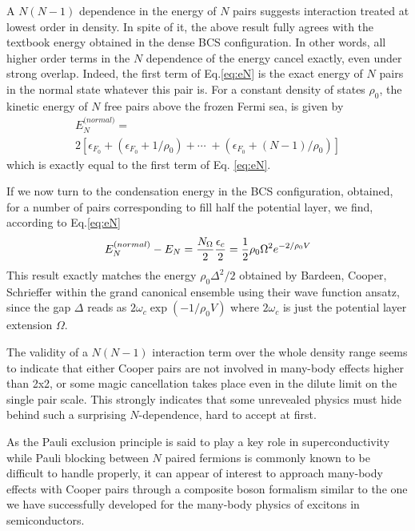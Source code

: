 \documentclass[epj]{svjour}
\begin{document}
A $N(N-1)$ dependence in the energy of $N$ pairs suggests interaction treated at lowest order in density. In spite of it, the above result fully agrees with the textbook energy obtained in the dense BCS configuration. In other words, all higher order terms in the $N$ dependence of the energy cancel exactly, even under strong overlap.  Indeed, the first term of Eq.\eqref{eq:eN} is
the exact energy of $N$ pairs in the normal state whatever this pair is. For a constant density of states $\rho _{0}$, the kinetic energy of $N$ free pairs above the frozen Fermi sea, is given by
\begin{multline}
{E}_{N}^{\text{(}normal)}= \\
2\left[\epsilon _{F_{0}}+\left( \epsilon _{F_{0}}+1/\rho _{0}\right) +\cdots
\;+\left( \epsilon _{F_{0}}+(N-1)/\rho _{0}\right)\right]
\end{multline}%
which is exactly equal to the first term of Eq. \eqref{eq:eN}.

If we now turn to the condensation energy in the BCS configuration, obtained, for a number of pairs corresponding to fill half the potential layer, we find,  according to Eq.\eqref{eq:eN}  
\begin{equation}
{E}_{N}^{\text{(}normal)}-{E}_{N}=\frac{N_{\Omega }}{2}\frac{%
\epsilon _{c}}{2}=\frac{1}{2}\rho _{0}\Omega ^{2}e^{-2/\rho _{0}V}
\end{equation}%
This result exactly matches the energy  $\rho _{0}\Delta ^{2}/2$ obtained by Bardeen, Cooper, Schrieffer within the grand canonical
ensemble using their wave function ansatz, since the gap $\Delta $ reads as $%
2\omega _{c}\exp \left( -1/\rho _{0}V\right) $ where $2\omega _{c}$ is just the
potential layer extension $\Omega $. 

The validity of a $N(N-1)$ interaction term over the whole density range seems to indicate that either Cooper pairs are not involved in many-body effects higher than 2x2, or some magic cancellation takes place even in the dilute limit on the single pair scale. This strongly indicates that some unrevealed physics must hide behind such a  surprising $N$-dependence, hard to accept at first. 

As the Pauli exclusion principle is said to play a key role in superconductivity while Pauli blocking between $N$ paired fermions is commonly known to be difficult to handle properly, it can appear of interest to approach many-body effects with Cooper pairs through a composite boson formalism similar to the one we have successfully developed for the many-body physics of excitons in semiconductors\cite
{CobosonPhysicsReports}.
\end{document}
